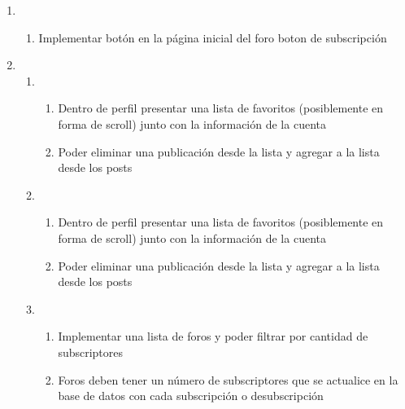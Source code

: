 \documentclass[12pt, letterpaper, notitlepage]{article}
\begin{document}
\begin{enumerate}
    \item {}
    	\begin{enumerate}
			\item Implementar botón en la página inicial del foro boton de subscripción
		\end{enumerate}

	\item {}
    	\begin{enumerate}
=======
		
		
		
		
		\item {}
		\begin{enumerate}
>>>>>>> d6fd33fbfe5f3adf86004f783dc0c625a1f2d4c0
			\item Dentro de perfil presentar una lista de favoritos (posiblemente en forma de scroll) junto con la información de la cuenta
			\item Poder eliminar una publicación desde la lista y agregar a la lista desde los posts
		\end{enumerate}
		
		\item {}
		\begin{enumerate}
			\item Dentro de perfil presentar una lista de favoritos (posiblemente en forma de scroll) junto con la información de la cuenta
			\item Poder eliminar una publicación desde la lista y agregar a la lista desde los posts
		\end{enumerate}
		
		
		\item {}
		\begin{enumerate}
			\item Implementar una lista de foros y poder filtrar por cantidad de subscriptores
			\item Foros deben tener un número de subscriptores que se actualice en la base de datos con cada subscripción o desubscripción
		\end{enumerate}
		

\end{enumerate}
\end{enumerate}
\end{document}
